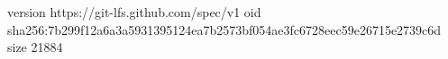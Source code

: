 version https://git-lfs.github.com/spec/v1
oid sha256:7b299f12a6a3a5931395124ea7b2573bf054ae3fc6728eec59e26715e2739c6d
size 21884
